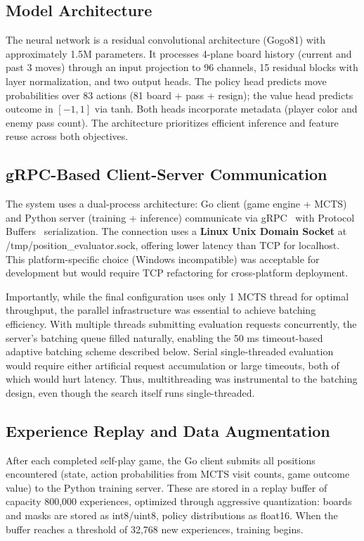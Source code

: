 \documentclass[12pt]{article}
\begin{document}
\subsection{Model Architecture}

The neural network is a residual convolutional architecture (Gogo81) with approximately 1.5M parameters. It processes 4-plane board history (current and past 3 moves) through an input projection to 96 channels, 15 residual blocks with layer normalization, and two output heads. The policy head predicts move probabilities over 83 actions (81 board + pass + resign); the value head predicts outcome in $[-1, 1]$ via tanh. Both heads incorporate metadata (player color and enemy pass count). The architecture prioritizes efficient inference and feature reuse across both objectives.

\subsection{gRPC-Based Client-Server Communication}

The system uses a dual-process architecture: Go client (game engine + MCTS) and Python server (training + inference) communicate via gRPC~\cite{google_grpc} with Protocol Buffers~\cite{google_protobuf} serialization. The connection uses a \textbf{Linux Unix Domain Socket} at {\ttfamily /tmp/\allowbreak position\_evaluator.\allowbreak sock}, offering lower latency than TCP for localhost. This platform-specific choice (Windows incompatible) was acceptable for development but would require TCP refactoring for cross-platform deployment.

Importantly, while the final configuration uses only 1 MCTS thread for optimal throughput, the parallel infrastructure was essential to achieve batching efficiency. With multiple threads submitting evaluation requests concurrently, the server's batching queue filled naturally, enabling the 50 ms timeout-based adaptive batching scheme described below. Serial single-threaded evaluation would require either artificial request accumulation or large timeouts, both of which would hurt latency. Thus, multithreading was instrumental to the batching design, even though the search itself runs single-threaded.

\subsection{Experience Replay and Data Augmentation}

After each completed self-play game, the Go client submits all positions encountered (state, action probabilities from MCTS visit counts, game outcome value) to the Python training server. These are stored in a replay buffer of capacity 800,000 experiences, optimized through aggressive quantization: boards and masks are stored as int8/uint8, policy distributions as float16. When the buffer reaches a threshold of 32,768 new experiences, training begins.
\end{document}
